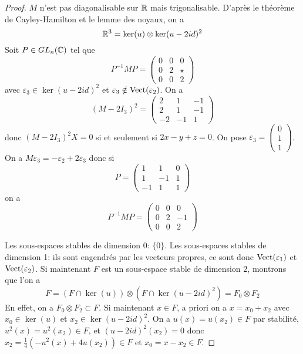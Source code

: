 \documentclass[12pt]{article}
\begin{document}
\begin{proof}
	$M$ n'est pas diagonalisable sur $\mathbb{R}$ mais trigonalisable. D'après le théorème de Cayley-Hamilton et le lemme des noyaux, on a 
	\begin{equation}
		\mathbb{R}^{3}=\ker(u)\otimes\ker(u-2 id)^{2}
	\end{equation}
	Soit $P\in GL_{n}(\mathbb{C})$ tel que 
	\begin{equation}
		P^{-1}MP=
		\begin{pmatrix}
			0&0&0\\
			0&2&\star\\
			0&0&2
		\end{pmatrix}
	\end{equation}
	avec $\varepsilon_{3}\in\ker(u-2id)^{2}$ et $\varepsilon_{3}\notin\operatorname{Vect}(\varepsilon_{2})$. On a 
	\begin{equation}
		(M-2I_{3})^{2}=
		\begin{pmatrix}
			2&1&-1\\
			2&1&-1\\
			-2&-1&1
		\end{pmatrix}
	\end{equation}
	donc $(M-2I_{3})^{2}X=0$ si et seulement si $2x-y+z=0$. On pose $\varepsilon_{3}=\begin{pmatrix}
		0\\1\\1
	\end{pmatrix}$. On a $M\varepsilon_{3}=-\varepsilon_{2}+2\varepsilon_{3}$ donc si 
	\begin{equation}
		P=
		\begin{pmatrix}
			1&1&0\\
			1&-1&1\\
			-1&1&1
		\end{pmatrix}
	\end{equation}
	on a 
	\begin{equation}
		P^{-1}MP=
		\begin{pmatrix}
			0&0&0\\
			0&2&-1\\
			0&0&2
		\end{pmatrix}
	\end{equation}

	Les sous-espaces stables de dimension $0$: $\lbrace0\rbrace$. Les sous-espaces stables de dimension 1: ils sont engendrés par les vecteurs propres, ce sont donc $\operatorname{Vect}(\varepsilon_{1})$ et $\operatorname{Vect}(\varepsilon_{2})$. Si maintenant $F$ est un sous-espace stable de dimension $2$, montrons que l'on a 
	\begin{equation}
		F=\left(F\cap\ker(u)\right)\otimes\left(F\cap\ker(u-2id)^{2}\right)=F_{0}\otimes F_{2}
	\end{equation}
	En effet, on a $F_{0}\otimes F_{2}\subset F$. Si maintenant $x\in F$, a priori on a $x=x_{0}+x_{2}$ avec $x_{0}\in\ker(u)$ et $x_{2}\in\ker(u-2id)^{2}$. On a $u(x)=u(x_{2})\in F$ par stabilité, $u^{2}(x)=u^{2}(x_{2})\in F$, et $(u-2id)^{2}(x_{2})=0$ donc $x_{2}=\frac{1}{4}\left(-u^{2}(x)+4u(x_{2})\right)\in F$ et $x_{0}=x-x_{2}\in F$.


\end{proof}
\end{document}
